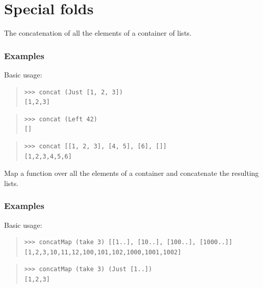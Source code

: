 \section{Special folds}
\begin{haddockdesc}
\item[\begin{tabular}{@{}l}
concat :: Foldable t => t {\char 91}a{\char 93} -> {\char 91}a{\char 93}
\end{tabular}]
{\haddockbegindoc
The concatenation of all the elements of a container of lists.\par
\subsubsection*{\textbf{Examples}}
Basic usage:\par
\begin{quote}
{\haddockverb\begin{verbatim}
>>> concat (Just [1, 2, 3])
[1,2,3]

\end{verbatim}}
\end{quote}
\begin{quote}
{\haddockverb\begin{verbatim}
>>> concat (Left 42)
[]

\end{verbatim}}
\end{quote}
\begin{quote}
{\haddockverb\begin{verbatim}
>>> concat [[1, 2, 3], [4, 5], [6], []]
[1,2,3,4,5,6]

\end{verbatim}}
\end{quote}}
\end{haddockdesc}
\begin{haddockdesc}
\item[\begin{tabular}{@{}l}
concatMap :: Foldable t => (a -> {\char 91}b{\char 93}) -> t a -> {\char 91}b{\char 93}
\end{tabular}]
{\haddockbegindoc
Map a function over all the elements of a container and concatenate
 the resulting lists.\par
\subsubsection*{\textbf{Examples}}
Basic usage:\par
\begin{quote}
{\haddockverb\begin{verbatim}
>>> concatMap (take 3) [[1..], [10..], [100..], [1000..]]
[1,2,3,10,11,12,100,101,102,1000,1001,1002]

\end{verbatim}}
\end{quote}
\begin{quote}
{\haddockverb\begin{verbatim}
>>> concatMap (take 3) (Just [1..])
[1,2,3]

\end{verbatim}}
\end{quote}}
\end{haddockdesc}

